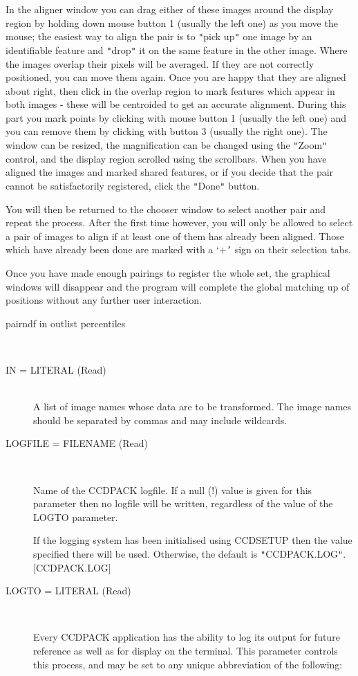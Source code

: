 \documentclass[twoside,11pt]{article}
\newcommand{\htmlref}[2]{#1}
\renewcommand{\_}{\texttt{\symbol{95}}}
\newcommand{\xroutine}[1]{\htmlref{{\sc #1}}{#1}}
\newcommand{\sstusage}[1]{\item[Usage:] \mbox{}
   \begin{description}
      {\ssttt \item #1}
   \end{description}
}
\newcommand{\sstparameters}[1]{
   \item[Parameters:] \mbox{} \\
   \vspace{-3.5ex}
   \begin{description}
      #1
   \end{description}
}
\newcommand{\sstsubsection}[1]{ \item[{#1}] \mbox{} \\}
\newcommand{\sstitemlist}[1]{
  \mbox{} \\
  \vspace{-3.5ex}
  \begin{itemize}
     #1
  \end{itemize}
}
\newcommand{\sstusage}[1]{\item[Usage:]
      \begin{description}
         {\ssttt #1}
      \end{description}
      \\
   }
\newcommand{\sstparameters}[1]{
      \item[Parameters:] \\
      \begin{description}
         #1
      \end{description}
      \\
   }
\newcommand{\sstsubsection}[1]{\item[{#1}]}
\newcommand{\sstitemlist}[1]{
      \begin{itemize}
         #1
      \end{itemize}
      \\
   }
\begin{document}
{{      In the aligner window you can drag either of these images around
      the display region by holding down mouse button 1 (usually the
      left one) as you move the mouse; the easiest way to align the pair
      is to {\tt "}pick up{\tt "} one image by an identifiable feature and {\tt "}drop{\tt "} it
      on the same feature in the other image.  Where the images overlap
      their pixels will be averaged.  If they are not correctly
      positioned, you can move them again.  Once you are happy that
      they are aligned about right, then click in the overlap region
      to mark features which appear in both images - these will be
      centroided to get an accurate alignment.  During this
      part you mark points by clicking with mouse button 1 (usually
      the left one) and you can remove them by clicking with button 3
      (usually the right one).  The window can be resized, the
      magnification can be changed using the {\tt "}Zoom{\tt "} control, and the
      display region scrolled using the scrollbars.  When you have aligned
      the images and marked shared features, or if you decide that
      the pair cannot be satisfactorily registered, click the {\tt "}Done{\tt "}
      button.

      You will then be returned to the chooser window to select another
      pair and repeat the process.  After the first time however,
      you will only be allowed to select a pair of images to align
      if at least one of them has already been aligned.  Those
      which have already been done are marked with a `$+${\tt '} sign on their
      selection tabs.

      Once you have made enough pairings to register the whole set, the
      graphical windows will disappear and the program will complete
      the global matching up of positions without any further user
      interaction.
   }
   \sstusage{
      pairndf in outlist percentiles
   }
   \sstparameters{
      \sstsubsection{
         IN = LITERAL (Read)
      }{
         A list of image names whose data are to be transformed. The image
         names should be separated by commas and may include wildcards.
      }
      \sstsubsection{
         LOGFILE = FILENAME (Read)
      }{
         Name of the CCDPACK logfile.  If a null (!) value is given for
         this parameter then no logfile will be written, regardless of
         the value of the LOGTO parameter.

         If the logging system has been initialised using \xroutine{CCDSETUP}
         then the value specified there will be used. Otherwise, the
         default is {\tt "}CCDPACK.LOG{\tt "}.
         [CCDPACK.LOG]
      }
      \sstsubsection{
         LOGTO = LITERAL (Read)
      }{
         Every CCDPACK application has the ability to log its output
         for future reference as well as for display on the terminal.
         This parameter controls this process, and may be set to any
         unique abbreviation of the following:
         \sstitemlist{

}}}}
\end{document}
